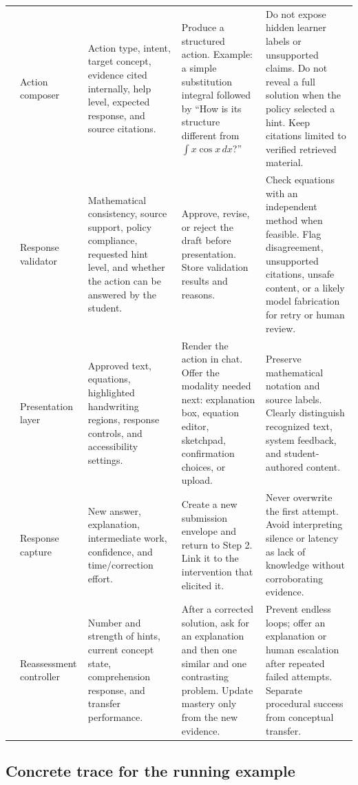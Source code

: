 \documentclass[11pt]{article}
\begin{document}
\begin{longtable}{@{}p{}p{}p{}p{}p{}@{}}
\addlinespace
11 & Action composer & Action type, intent, target concept, evidence cited internally, help level, expected response, and source citations. & Produce a structured action. Example: a simple substitution integral followed by ``How is its structure different from $\int x\cos x\,dx$?'' & Do not expose hidden learner labels or unsupported claims. Do not reveal a full solution when the policy selected a hint. Keep citations limited to verified retrieved material. \\
\addlinespace
12 & Response validator & Mathematical consistency, source support, policy compliance, requested hint level, and whether the action can be answered by the student. & Approve, revise, or reject the draft before presentation. Store validation results and reasons. & Check equations with an independent method when feasible. Flag disagreement, unsupported citations, unsafe content, or a likely model fabrication for retry or human review. \\
\addlinespace
13 & Presentation layer & Approved text, equations, highlighted handwriting regions, response controls, and accessibility settings. & Render the action in chat. Offer the modality needed next: explanation box, equation editor, sketchpad, confirmation choices, or upload. & Preserve mathematical notation and source labels. Clearly distinguish recognized text, system feedback, and student-authored content. \\
\addlinespace
14 & Response capture & New answer, explanation, intermediate work, confidence, and time/correction effort. & Create a new submission envelope and return to Step 2. Link it to the intervention that elicited it. & Never overwrite the first attempt. Avoid interpreting silence or latency as lack of knowledge without corroborating evidence. \\
\addlinespace
15 & Reassessment controller & Number and strength of hints, current concept state, comprehension response, and transfer performance. & After a corrected solution, ask for an explanation and then one similar and one contrasting problem. Update mastery only from the new evidence. & Prevent endless loops; offer an explanation or human escalation after repeated failed attempts. Separate procedural success from conceptual transfer. \\
\bottomrule
\end{longtable}
\normalsize

\subsection{Concrete trace for the running example}
\end{document}
